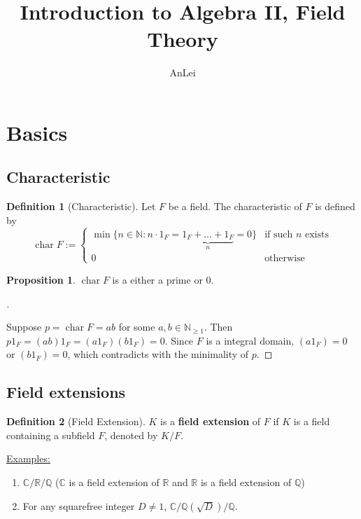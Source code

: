 \documentclass{article}
\title{Introduction to Algebra II, Field Theory}
\author{AnLei}
\date{ }
\theoremstyle{definition}
\newcommand{\ex}{\noindent\underline{Examples:}}
\newtheorem{dfn}{Definition}
\newtheorem{prop}{Proposition}
\newenvironment{proofs}[1][\proofname]{%
  \begin{proof}[#1]$ $\par\nobreak\ignorespaces
}{%
  \end{proof}
}
\newcommand{\CC}{\mathbb C}
\newcommand{\NN}{\mathbb N}
\newcommand{\QQ}{\mathbb Q}
\newcommand{\RR}{\mathbb R}
\DeclareMathOperator{\Char}{char}
\begin{document}
\maketitle
\tableofcontents

\section{Basics}

\subsection{Characteristic}

\begin{dfn}[Characteristic]
	Let $F$ be a field. The characteristic of $F$ is defined by
	$$\Char F := \begin{cases*} \min\{n\in\NN : n\cdot 1_F=\underbrace{1_F+\dots+ 1_F}_n = 0\} & \text{if such $n$ exists}\\ 0 & \text{otherwise}\end{cases*}$$
\end{dfn}

\begin{prop} $\Char F$ is a either a prime or $0$.
\end{prop}

\begin{proofs}
	Suppose $p=\Char F=ab$ for some $a,b\in \NN_{\ge 1}$. Then $p1_F=(ab)1_F=(a1_F)(b1_F)=0$. Since $F$ is a integral domain, $(a1_F)=0$ or $(b1_F)=0$, which contradicts with the minimality of $p$.
\end{proofs}

\subsection{Field extensions}

\begin{dfn}[Field Extension]
	$K$ is a \textbf{field extension} of $F$ if $K$ is a field containing a subfield $F$, denoted by $K/F$.
\end{dfn}

\ex

\begin{enumerate}
	\item $\CC/\RR/\QQ$ ($\CC$ is a field extension of $\RR$ and $\RR$ is a field extension of $\QQ$)
	\item For any squarefree integer $D\neq 1$, $\CC / \QQ(\sqrt{D}) / \QQ$.
\end{enumerate}
\end{document}

